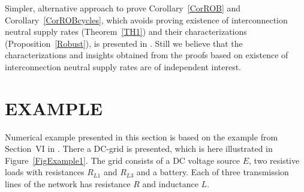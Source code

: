\documentclass[11pt,a4paper,oneside,DIV=12,headings=small]{scrartcl}
\theoremstyle{plain}
\begin{document}
Simpler, alternative approach to prove Corollary~\ref{CorROB} and Corollary~\ref{CorROBcycles}, which avoids proving existence of interconnection neutral supply rates (Theorem~\ref{TH1}) and their characterizations (Proposition~\ref{Robust}), is presented in \cite{JokicNakic_MTNS}. Still we believe that the characterizations and insights obtained from the proofs based on existence of interconnection neutral supply rates are of independent interest.  


%
%
%

\section{EXAMPLE}
\label{Example}

Numerical example presented in this section is based on the example from Section~VI in \cite{Ebihara}. There a DC-grid is presented, which is here illustrated in Figure~\ref{FigExample1}. The grid consists of a DC voltage source $E$, two resistive loads with resistances $R_{L1}$ and $R_{L3}$ and a battery. Each of three transmission lines of the network has resistance $R$ and inductance $L$.  

\end{document}
